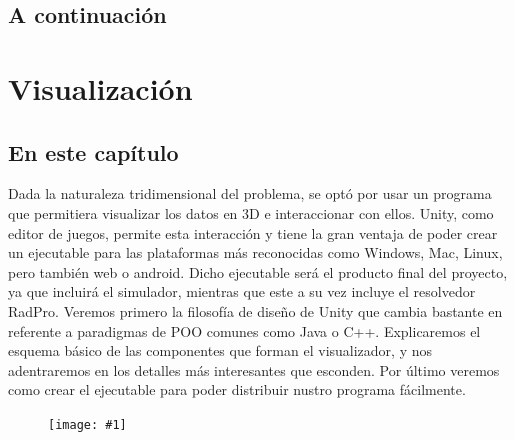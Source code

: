 \documentclass[12pt,a4paper,openright,oneside]{article}
\newcommand{\includeImage}[1]
{
	\begin{figure}[htb]
	\begin{center}
	\texttt{[image: \#1]}
	\end{center}
	\end{figure}
}
\numberwithin{equation}{section}
\theoremstyle{definition}
\begin{document}
\subsection{A continuación}
\newpage




\section{Visualización}

\subsection{En este capítulo}
Dada la naturaleza tridimensional del problema, se optó por usar un programa que permitiera visualizar los datos en 3D e interaccionar con ellos. Unity, como editor de juegos, permite esta interacción y tiene la gran ventaja de poder crear un ejecutable para las plataformas más reconocidas como Windows, Mac, Linux, pero también web o android. Dicho ejecutable será el producto final del proyecto, ya que incluirá el simulador, mientras que este a su vez incluye el resolvedor RadPro. Veremos primero la filosofía de diseño de Unity que cambia bastante en referente a paradigmas de POO comunes como Java o C++. Explicaremos el esquema básico de las componentes que forman el visualizador, y nos adentraremos en los detalles más interesantes que esconden. Por último veremos como crear el ejecutable para poder distribuir nustro programa fácilmente.
\includeImage{visualization.png}
\end{document}
